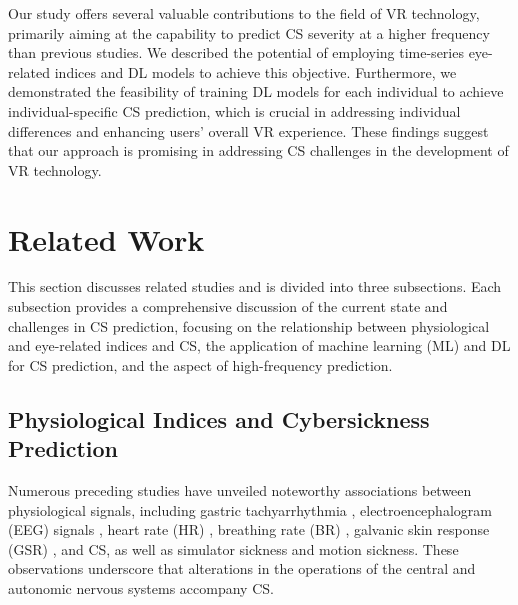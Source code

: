 \documentclass{ieeeaccess}
\begin{document}
Our study offers several valuable contributions to the field of VR technology, primarily aiming at the capability to predict CS severity at a higher frequency than previous studies. We described the potential of employing time-series eye-related indices and DL models to achieve this objective. Furthermore, we demonstrated the feasibility of training DL models for each individual to achieve individual-specific CS prediction, which is crucial in addressing individual differences and enhancing users’ overall VR experience. These findings suggest that our approach is promising in addressing CS challenges in the development of VR technology.

\section{Related Work}
This section discusses related studies and is divided into three subsections. Each subsection provides a comprehensive discussion of the current state and challenges in CS prediction, focusing on the relationship between physiological and eye-related indices and CS, the application of machine learning (ML) and DL for CS prediction, and the aspect of high-frequency prediction.

\subsection{Physiological Indices and Cybersickness Prediction}
Numerous preceding studies have unveiled noteworthy associations between physiological signals, including gastric tachyarrhythmia \cite{Kim_2005}, electroencephalogram (EEG) signals \cite{Kim_2005, Kim_2019, Islam_2_2020, Oh_2022, Nasqvi_2015}, heart rate (HR) \cite{Kim_2005, Yokota_2005, Islam_2_2020, Nalivaiko_2015}, breathing rate (BR) \cite{Bruck_2011, Islam_2_2020}, galvanic skin response (GSR) \cite{Islam_2_2020, Irmak_2021}, and CS, as well as simulator sickness and motion sickness. These observations underscore that alterations in the operations of the central and autonomic nervous systems accompany CS.
\end{document}
